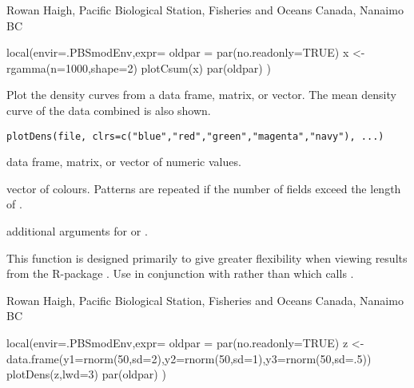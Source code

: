 \documentclass[letterpaper]{book}
\begin{document}
%
\begin{Author}\relax
Rowan Haigh, Pacific Biological Station, Fisheries and Oceans Canada, Nanaimo BC
\end{Author}
%
\begin{Examples}
\begin{ExampleCode}
local(envir=.PBSmodEnv,expr={
  oldpar = par(no.readonly=TRUE)
  x <- rgamma(n=1000,shape=2)
  plotCsum(x)
  par(oldpar)
})
\end{ExampleCode}
\end{Examples}
%
\begin{Description}\relax
Plot the density curves from a data frame, matrix, or vector. 
The mean density curve of the data combined is also shown.
\end{Description}
%
\begin{Usage}
\begin{verbatim}
plotDens(file, clrs=c("blue","red","green","magenta","navy"), ...)  
\end{verbatim}
\end{Usage}
%
\begin{Arguments}
\begin{ldescription}
\item[\code{file}] data frame, matrix, or vector of numeric values.
\item[\code{clrs}] vector of colours. Patterns are repeated if the number 
of fields exceed the length of .
\item[\code{...}] additional arguments for  or .
\end{ldescription}
\end{Arguments}
%
\begin{Details}\relax
This function is designed primarily to give greater flexibility when viewing 
results from the R-package . Use  in conjunction with 
 rather than  
which calls .
\end{Details}
%
\begin{Author}\relax
Rowan Haigh, Pacific Biological Station, Fisheries and Oceans Canada, Nanaimo BC
\end{Author}
%
\begin{Examples}
\begin{ExampleCode}
local(envir=.PBSmodEnv,expr={
  oldpar = par(no.readonly=TRUE)
  z <- data.frame(y1=rnorm(50,sd=2),y2=rnorm(50,sd=1),y3=rnorm(50,sd=.5))
  plotDens(z,lwd=3)
  par(oldpar)
})
\end{ExampleCode}
\end{Examples}
\end{document}
